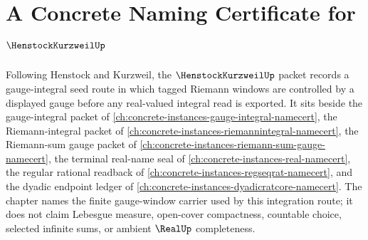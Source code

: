 \chapter{A Concrete Naming Certificate for $\HenstockKurzweilUp$}
\label{ch:concrete-instances-henstock-kurzweil-namecert}

Following Henstock and Kurzweil, the $\HenstockKurzweilUp$ packet records a gauge-integral seed route in which tagged Riemann windows are controlled by a displayed gauge before any real-valued integral read is exported. It sits beside the gauge-integral packet of \autoref{ch:concrete-instances-gauge-integral-namecert}, the Riemann-integral packet of \autoref{ch:concrete-instances-riemannintegral-namecert}, the Riemann-sum gauge packet of \autoref{ch:concrete-instances-riemann-sum-gauge-namecert}, the terminal real-name seal of \autoref{ch:concrete-instances-real-namecert}, the regular rational readback of \autoref{ch:concrete-instances-regseqrat-namecert}, and the dyadic endpoint ledger of \autoref{ch:concrete-instances-dyadicratcore-namecert}. The chapter names the finite gauge-window carrier used by this integration route; it does not claim Lebesgue measure, open-cover compactness, countable choice, selected infinite sums, or ambient $\RealUp$ completeness.

